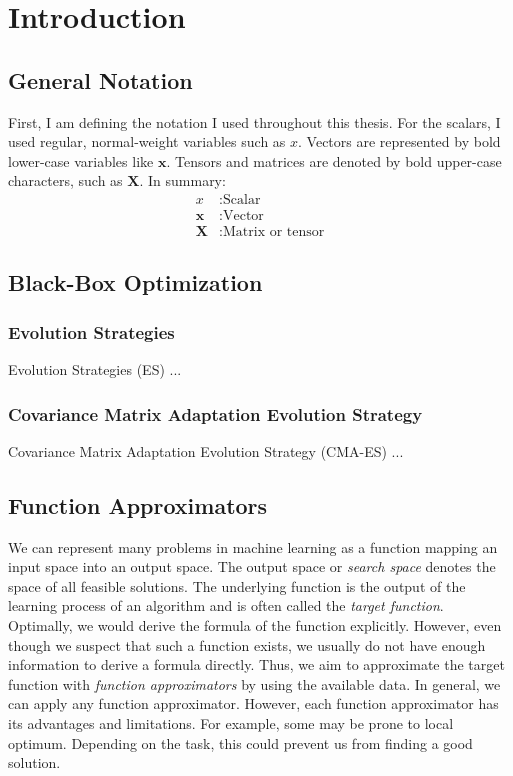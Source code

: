 
\chapter{Introduction}
\label{ch:introduction}

\section{General Notation}
First, I am defining the notation I used throughout this thesis. For the scalars, I used regular, normal-weight variables such as $x$. Vectors are represented by bold lower-case variables like $\mathbf{x}$. Tensors and matrices are denoted by bold upper-case characters, such as $\mathbf{X}$. In summary:
\begin{align*}
x&: \text{Scalar} \\
\mathbf{x}&: \text{Vector} \\
\mathbf{X}&: \text{Matrix or tensor}
\end{align*}


\section{Black-Box Optimization}
\subsection{Evolution Strategies}
Evolution Strategies (ES) ...

\subsection{Covariance Matrix Adaptation Evolution Strategy}
Covariance Matrix Adaptation Evolution Strategy (CMA-ES) ...

\section{Function Approximators}
We can represent many problems in machine learning as a function mapping an input space into an output space. The output space or \textit{search space} denotes the space of all feasible solutions. The underlying function is the output of the learning process of an algorithm and is often called the \textit{target function}. Optimally, we would derive the formula of the function explicitly. However, even though we suspect that such a function exists, we usually do not have enough information to derive a formula directly. Thus, we aim to approximate the target function with \textit{function approximators} by using the available data. In general, we can apply any function approximator. However, each function approximator has its advantages and limitations. For example, some may be prone to local optimum. Depending on the task, this could prevent us from finding a good solution.

